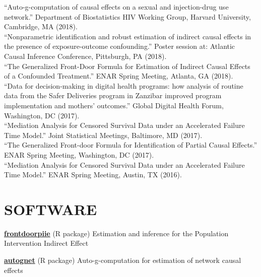 \documentclass[12pt]{article}
\begin{document}
``Auto-g-computation of causal effects on a sexual and injection-drug use network.'' Department of Biostatistics HIV Working Group, Harvard University, Cambridge, MA (2018). \\

``Nonparametric identification and robust estimation of indirect causal effects in the presence of exposure-outcome confounding.'' Poster session at: Atlantic Causal Inference Conference, Pittsburgh, PA (2018). \\

``The Generalized Front-Door Formula for Estimation of Indirect Causal Effects of a Confounded Treatment.'' ENAR Spring Meeting, Atlanta, GA (2018). \\

``Data for decision-making in digital health programs: how analysis of routine data from the Safer Deliveries program in Zanzibar improved program implementation and mothers' outcomes.'' Global Digital Health Forum, Washington, DC (2017). \\

``Mediation Analysis for Censored Survival Data under an Accelerated Failure Time Model.'' Joint Statistical Meetings, Baltimore, MD (2017). \\

``The Generalized Front-door Formula for Identification of Partial Causal Effects.'' ENAR Spring Meeting, Washington, DC (2017). \\

``Mediation Analysis for Censored Survival Data under an Accelerated Failure Time Model.'' ENAR Spring Meeting, Austin, TX (2016). 


\section*{\textbf{{\large S}{OFTWARE}}}

{\bf \href{https://isabelfulcher.github.io/frontdoorpiie/}{frontdoorpiie}} (R package) Estimation and inference for the Population Intervention Indirect Effect \\
\vspace{-.3cm}

{\bf \href{https://isabelfulcher.github.io/autognet/}{autognet}} (R package) Auto-g-computation for estimation of network causal effects
\end{document}
